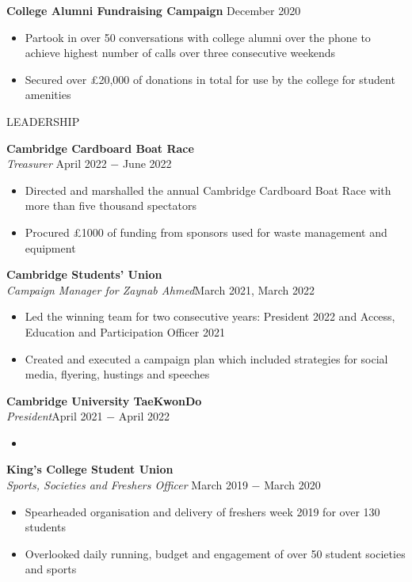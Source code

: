 \documentclass{article}
\begin{document}
\textbf{College Alumni Fundraising Campaign} \hfill December 2020
\begin{itemize}
    \item Partook in over 50 conversations with college alumni over the phone to achieve highest number of calls over three consecutive weekends
    \item Secured over £20,000 of donations in total for use by the college for student amenities
\end{itemize} \medskip

\uppercase{Leadership}

\textbf{Cambridge Cardboard Boat Race} \\
\textit{Treasurer} \hfill April 2022 $-$ June 2022
\begin{itemize}
    \item Directed and marshalled the annual Cambridge Cardboard Boat Race with more than five thousand spectators
    \item Procured £1000 of funding from sponsors used for waste management and equipment
\end{itemize} \medskip

\textbf{Cambridge Students' Union} \\
\textit{Campaign Manager for Zaynab Ahmed}\hfill March 2021, March 2022
\begin{itemize}
    \item Led the winning team for two consecutive years: President 2022 and Access, Education and Participation Officer 2021
    \item Created and executed a campaign plan which included strategies for social media, flyering, hustings and speeches
\end{itemize} \medskip

\textbf{Cambridge University TaeKwonDo} \\
\textit{President}\hfill April 2021 $-$ April 2022
\begin{itemize}
    \item 
\end{itemize} \medskip

\textbf{King's College Student Union} \\
\textit{Sports, Societies and Freshers Officer }\hfill March 2019 $-$ March 2020
\begin{itemize}
    \item Spearheaded organisation and delivery of freshers week 2019 for over 130 students
    \item Overlooked daily running, budget and engagement of over 50 student societies and sports
\end{itemize} \medskip
\end{document}
